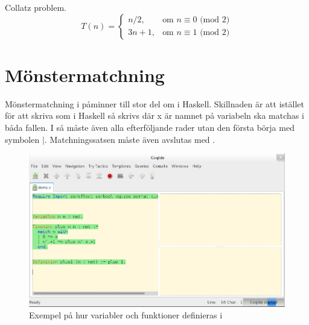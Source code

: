 Collatz problem.
\begin{equation}
T(n) = \left\{\begin{matrix} n/2, & \mbox{om }n\equiv0\mbox{ (mod 2)} \\ 3n+1,
                         & \mbox{om }n\equiv1\mbox{ (mod 2)} \end{matrix}\right.
\end{equation}

\section{Mönstermatchning}
Mönstermatchning i \coq påminner till stor del om  i Haskell.
Skillnaden är att istället för att skriva  som i Haskell så skrivs
 där x är namnet på variabeln ska matchas i båda fallen. I \coq
så måste även alla efterföljande rader utan den första börja med symbolen $|$.
Matchningssatsen måste även avslutas med .

\begin{figure}[H]
  \centering
  \includegraphics[width=150mm]{images/Variables_and_Functions}
  \caption[Variabler och funktioner]
   {Exempel på hur variabler och funktioner definieras i \coq}
\end{figure}
